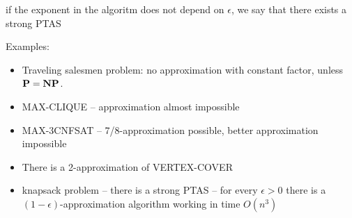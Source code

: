 \begin{enumerate}
\begin{itemize}
        if the exponent in the algoritm does not depend on $\epsilon$, we say that there exists a strong PTAS 
    \end{itemize}
    
    Examples:
    \begin{itemize}
        \item Traveling salesmen problem: no approximation with constant factor, unless $\textbf{P} = \textbf{NP}$.
        \item MAX-CLIQUE – approximation almost impossible
        \item MAX-3CNFSAT – 7/8-approximation possible,
        better approximation impossible
        \item There is a 2-approximation of VERTEX-COVER
        \item knapsack problem – there is a strong PTAS – for every $\epsilon > 0 $ there is a $(1-\epsilon)$-approximation algorithm working in time $O(n^3)$ 
    \end{itemize}
    
    
    

    
\end{enumerate}